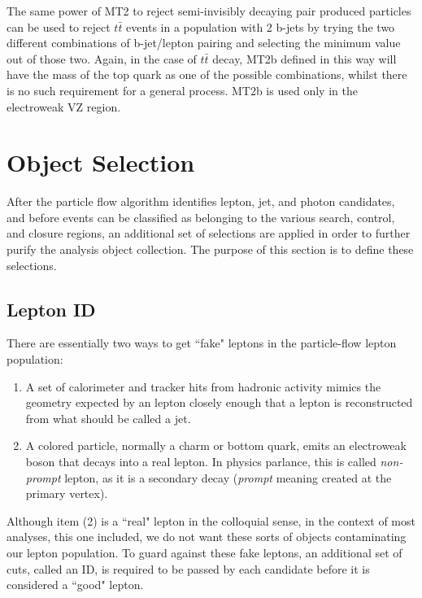       The same power of MT2 to reject semi-invisibly decaying pair produced particles can be used to reject $t\bar{t}$ events in a population with 2 b-jets by trying the two different combinations of b-jet/lepton pairing and selecting the minimum value out of those two. Again, in the case of $t\bar{t}$ decay, MT2b defined in this way will have the mass of the top quark as one of the possible combinations, whilst there is no such requirement for a general process. MT2b is used only in the electroweak VZ region.

\section{Object Selection}


  After the particle flow algorithm identifies lepton, jet, and photon candidates, and before events can be classified as belonging to the various search, control, and closure regions, an additional set of selections are applied in order to further purify the analysis object collection. The purpose of this section is to define these selections.

  \subsection{Lepton ID} \label{sec:lepton_id}
    There are essentially two ways to get ``fake" leptons in the particle-flow lepton population:

    \begin{enumerate}
      \item A set of calorimeter and tracker hits from hadronic activity mimics the geometry expected by an lepton closely enough that a lepton is reconstructed from what should be called a jet.
      \item A colored particle, normally a charm or bottom quark, emits an electroweak boson that decays into a real lepton. In physics parlance, this is called \emph{non-prompt} lepton, as it is a secondary decay (\emph{prompt} meaning created at the primary vertex).
    \end{enumerate}

    Although item (2) is a ``real" lepton in the colloquial sense, in the context of most analyses, this one included, we do not want these sorts of objects contaminating our lepton population. To guard against these fake leptons, an additional set of cuts, called an ID, is required to be passed by each candidate before it is considered a ``good" lepton.

